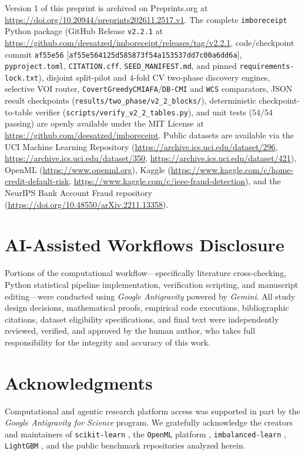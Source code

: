 \documentclass[11pt]{article}
\theoremstyle{remark}
\begin{document}
{\raggedright Version 1 of this preprint is archived on Preprints.org at \url{https://doi.org/10.20944/preprints202611.2517.v1}. The complete \texttt{imboreceipt} Python package (GitHub Release \texttt{v2.2.1} at \url{https://github.com/deesatzed/imboreceipt/releases/tag/v2.2.1}, code/checkpoint commit \texttt{af55e56} [\texttt{af55e564125d585873f54a153537dd7c00a6dd6a}], \texttt{pyproject.toml}, \texttt{CITATION.cff}, \texttt{SEED\_MANIFEST.md}, and pinned \texttt{requirements-lock.txt}), disjoint split-pilot and $4$-fold CV two-phase discovery engines, selective VOI router, \texttt{CovertGreedyCMIAFA}/\texttt{DB-CMI} and \texttt{WCS} comparators, JSON result checkpoints (\texttt{results/two\_phase/v2\_2\_blocks/}), deterministic checkpoint-to-table verifier (\texttt{scripts/verify\_v2\_2\_tables.py}), and unit tests ($54/54$ passing) are openly available under the MIT License at \url{https://github.com/deesatzed/imboreceipt}. Public datasets are available via the UCI Machine Learning Repository (\url{https://archive.ics.uci.edu/dataset/296}, \url{https://archive.ics.uci.edu/dataset/350}, \url{https://archive.ics.uci.edu/dataset/421}), OpenML (\url{https://www.openml.org}), Kaggle (\url{https://www.kaggle.com/c/home-credit-default-risk}, \url{https://www.kaggle.com/c/ieee-fraud-detection}), and the NeurIPS Bank Account Fraud repository (\url{https://doi.org/10.48550/arXiv.2211.13358}).\par}

\section*{AI-Assisted Workflows Disclosure}

Portions of the computational workflow---specifically literature cross-checking, Python statistical pipeline implementation, verification scripting, and manuscript editing---were conducted using \emph{Google Antigravity} powered by \emph{Gemini}. All study design decisions, mathematical proofs, empirical code executions, bibliographic citations, dataset eligibility specifications, and final text were independently reviewed, verified, and approved by the human author, who takes full responsibility for the integrity and accuracy of this work.

\section*{Acknowledgments}

Computational and agentic research platform access was supported in part by the \emph{Google Antigravity for Science} program. We gratefully acknowledge the creators and maintainers of \texttt{scikit-learn} \citep{pedregosa2011scikit}, the \texttt{OpenML} platform \citep{vanschoren2014openml}, \texttt{imbalanced-learn} \citep{lemaitre2017imbalanced}, \texttt{LightGBM} \citep{ke2017lightgbm}, and the public benchmark repositories analyzed herein.
\end{document}
